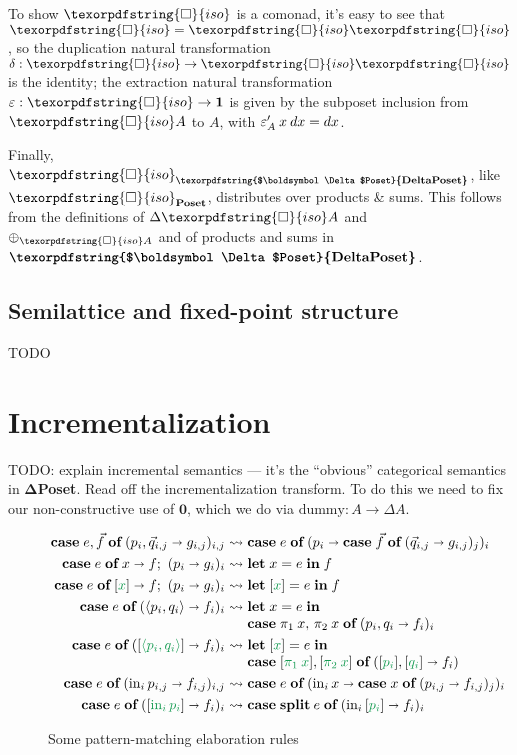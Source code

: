 \documentclass{rntz}\usepackage[a5]{rntzgeometry}\usepackage[fullwidth=130mm,width=330pt,]{narrow}
\newcommand\mathvar[1]{\ensuremath{#1}} %
\newcommand\todo[1]{{\color{ACMRed}#1}}
\newcommand\isocolor{\color{ForestGreen}} %
\newcommand\cat\textbf
\newcommand\CP{\cat{\texorpdfstring{$\boldsymbol\Delta$Poset}{DeltaPoset}}}
\newcommand\Poset{\cat{Poset}}
\newcommand\D\Delta
\newcommand\injc{\text{in}}
\newcommand\inj[1]{\injc_{#1}\,}
\newcommand\zero{\ensuremath{\mathbold{0}}}
\newcommand\<{\mskip 4mu plus 4mu minus 1mu}
\newcommand\dx{\mathvar{dx}}
\newcommand\iso{{\texorpdfstring{\ensuremath{\square}}{iso}}}
\newcommand\isof{\iso}
\newcommand\fname\text
\newcommand\chgs[1]{\D{#1}}
\newcommand\deriv[1]{\ensuremath{#1'}}
\newcommand\upd{\mathbin{\oplus}}
\newcommand\updfn{\ensuremath{{\upd}}}
\newcommand\kwname\textbf
\newcommand\ecase[1]{\kwname{case} \;{#1}\; \kwname{of}\;}
\newcommand\caseto\shortrightarrow
\newcommand\ebox[1]{[{#1}]}
\newcommand\elet[1]{\kwname{let}\;#1\;\kwname{in}\;}
\newcommand\eboxd[1]{\ebox{\isocolor #1}}
\newcommand\etuple[1]{\langle{#1}\rangle}
\newcommand\splitsum{\kwname{split}\<}
\begin{document}
\noindent
To show $\iso$ is a comonad, it's easy to see that ${\iso} = {\iso\iso}$, so the
duplication natural transformation $\delta : {\iso} \to {\iso\iso}$ is the
identity; the extraction natural transformation $\varepsilon : {\iso} \to
\mathbold{1}$ is given by the subposet inclusion from $\isof A$ to $A$, with
$\deriv{\varepsilon_A} \<x \<\dx = \dx$.

Finally, $\iso_\CP$, like $\iso_\Poset$, distributes over products \& sums. This
follows from the definitions of $\chgs{\iso A}$ and $\updfn_{\iso A}$ and of
products and sums in $\CP$.


\subsection{Semilattice and fixed-point structure}

\todo{TODO}


\section{Incrementalization}
\label{sec:incremental}

\todo{TODO: explain incremental semantics --- it's the ``obvious'' categorical
  semantics in \CP{}. Read off the incrementalization transform. To do this we
  need to fix our non-constructive use of $\zero$, which we do via
  $\fname{dummy} : A \to \chgs A$.}

\newcommand\expandsto{\rightsquigarrow}
\begin{figure*}
  \[\setlength\arraycolsep{.15em}\begin{array}{rcl}
    \ecase{e,\vec f} (p_i, \vec q_{i,j} \caseto g_{i,j})_{i,j}
    &\expandsto& \ecase{e} (p_i \caseto \ecase{\vec f} (\vec q_{i,j} \caseto g_{i,j})_j)_i
    \\[.33em]
    \ecase{e} x \caseto f;\ (p_i \caseto g_i)_i
    &\expandsto& \elet{x = e} f
    \\[.33em]
    \ecase{e} \eboxd x \caseto f;\ (p_i \caseto g_i)_i
    &\expandsto& \elet{\eboxd x = e} f
    \\[.33em]
    \ecase{e} (\etuple{p_i,q_i} \caseto f_i)_i
    &\expandsto& \elet{x = e}\\
    && \ecase{\pi_1\< x,\, \pi_2\< x} (p_i,q_i \caseto f_i)_i
    \\[.33em]
    \ecase{e} (\eboxd{\etuple{p_i,q_i}} \caseto f_i)_i
    &\expandsto& \elet{\eboxd x = e}\\
    && \ecase{\eboxd{\pi_1\<x}, \eboxd{\pi_2\<x}}
    (\eboxd{p_i}, \eboxd{q_i} \caseto f_i)
    \\[.33em]
    \ecase{e} (\inj i p_{i,j} \caseto f_{i,j})_{i,j}
    &\expandsto& \ecase{e} (\inj i x \caseto \ecase{x} (p_{i,j} \caseto f_{i,j})_j)_i
    \\[.33em]
    \ecase{e} (\eboxd{\inj i p_i} \caseto f_i)_i
    &\expandsto& \ecase{\splitsum e} (\inj i \eboxd{p_i} \caseto f_i)_i
  \end{array}\]
  \caption{Some pattern-matching elaboration rules}
\end{figure*}
\end{document}
